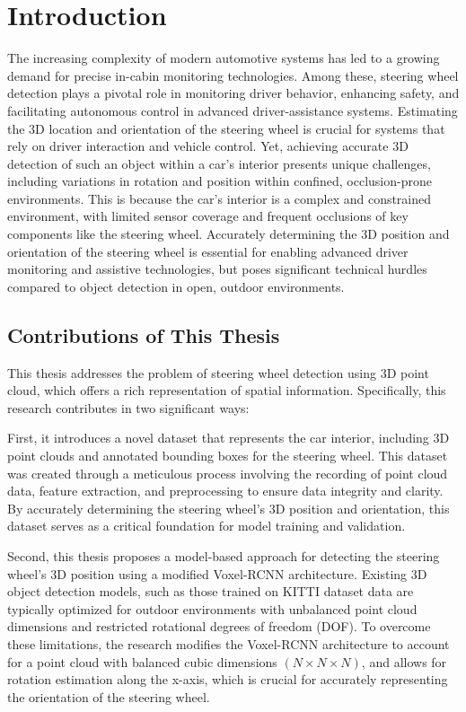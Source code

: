 \chapter{Introduction}


The increasing complexity of modern automotive systems has led to a growing
demand for precise in-cabin monitoring technologies. Among these, 
steering wheel detection plays a pivotal role in monitoring driver
behavior, enhancing safety, and facilitating autonomous control in 
advanced driver-assistance systems. Estimating the 3D location and 
orientation of the steering wheel is crucial for systems that rely on
driver interaction and vehicle control. 
Yet, achieving accurate 3D detection of such an object within a car's 
interior presents unique challenges, including variations in rotation and
position within confined, occlusion-prone environments. This is because 
the car's interior is a complex and constrained environment, with limited 
sensor coverage and frequent occlusions of key components like the 
steering wheel. Accurately determining the 3D position and orientation of 
the steering wheel is essential for enabling advanced driver monitoring 
and assistive technologies, but poses significant technical hurdles 
compared to object detection in open, outdoor environments. 


\section{Contributions of This Thesis}
This thesis addresses the problem of steering wheel detection using 3D 
point cloud, which offers a rich representation of spatial information. 
Specifically, this research contributes in two significant ways: 

First, it introduces a novel dataset that represents the car interior, 
including 3D point clouds and annotated bounding boxes for the steering 
wheel. This dataset was created through a meticulous process involving 
the recording of point cloud data, feature extraction, and preprocessing 
to ensure data integrity and clarity. By accurately determining the 
steering wheel’s 3D position and orientation, this dataset serves as a 
critical foundation for model training and validation.

Second, this thesis proposes a model-based approach for detecting the 
steering wheel’s 3D position using a modified Voxel-RCNN \cite{voxelrcnn} architecture. 
Existing 3D object detection models, such as those trained on KITTI 
dataset data are typically optimized for outdoor environments with 
unbalanced point cloud dimensions and restricted rotational degrees of 
freedom (DOF). To overcome these limitations, the research modifies the Voxel-RCNN 
architecture to account for a point cloud with balanced cubic dimensions \((N \times N \times N)\), and allows for rotation estimation along 
the x-axis, which is crucial for accurately representing the orientation of the steering wheel.

